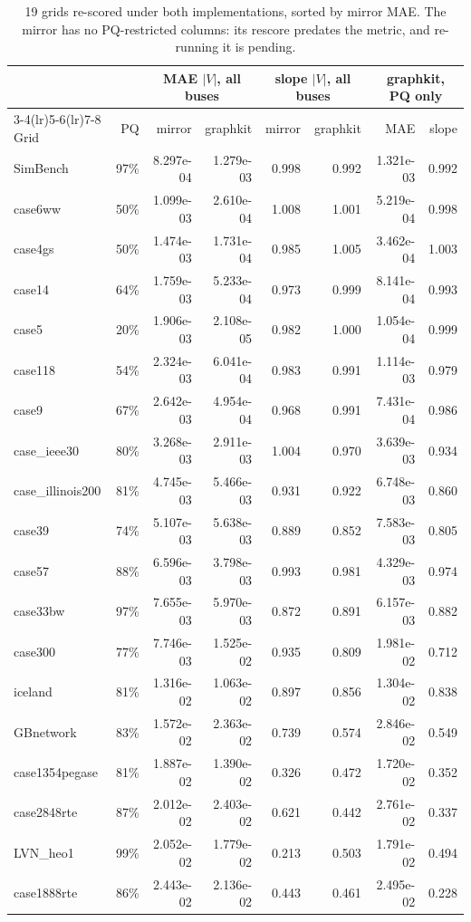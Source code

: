\documentclass[10pt]{article}
\begin{document}
\begin{table}[H]
\centering
\small
\begin{tabular}{lrrrrrrr}
\toprule
 & & \multicolumn{2}{c}{MAE $|V|$, all buses} & \multicolumn{2}{c}{slope $|V|$, all buses} & \multicolumn{2}{c}{graphkit, PQ only} \\
\cmidrule(lr){3-4}\cmidrule(lr){5-6}\cmidrule(lr){7-8}
Grid & PQ & mirror & graphkit & mirror & graphkit & MAE & slope \\
\midrule
SimBench & 97\% & 8.297e-04 & 1.279e-03 & 0.998 & 0.992 & 1.321e-03 & 0.992 \\
case6ww & 50\% & 1.099e-03 & 2.610e-04 & 1.008 & 1.001 & 5.219e-04 & 0.998 \\
case4gs & 50\% & 1.474e-03 & 1.731e-04 & 0.985 & 1.005 & 3.462e-04 & 1.003 \\
case14 & 64\% & 1.759e-03 & 5.233e-04 & 0.973 & 0.999 & 8.141e-04 & 0.993 \\
case5 & 20\% & 1.906e-03 & 2.108e-05 & 0.982 & 1.000 & 1.054e-04 & 0.999 \\
case118 & 54\% & 2.324e-03 & 6.041e-04 & 0.983 & 0.991 & 1.114e-03 & 0.979 \\
case9 & 67\% & 2.642e-03 & 4.954e-04 & 0.968 & 0.991 & 7.431e-04 & 0.986 \\
case\_ieee30 & 80\% & 3.268e-03 & 2.911e-03 & 1.004 & 0.970 & 3.639e-03 & 0.934 \\
case\_illinois200 & 81\% & 4.745e-03 & 5.466e-03 & 0.931 & 0.922 & 6.748e-03 & 0.860 \\
case39 & 74\% & 5.107e-03 & 5.638e-03 & 0.889 & 0.852 & 7.583e-03 & 0.805 \\
case57 & 88\% & 6.596e-03 & 3.798e-03 & 0.993 & 0.981 & 4.329e-03 & 0.974 \\
case33bw & 97\% & 7.655e-03 & 5.970e-03 & 0.872 & 0.891 & 6.157e-03 & 0.882 \\
case300 & 77\% & 7.746e-03 & 1.525e-02 & 0.935 & 0.809 & 1.981e-02 & 0.712 \\
iceland & 81\% & 1.316e-02 & 1.063e-02 & 0.897 & 0.856 & 1.304e-02 & 0.838 \\
GBnetwork & 83\% & 1.572e-02 & 2.363e-02 & 0.739 & 0.574 & 2.846e-02 & 0.549 \\
case1354pegase & 81\% & 1.887e-02 & 1.390e-02 & 0.326 & 0.472 & 1.720e-02 & 0.352 \\
case2848rte & 87\% & 2.012e-02 & 2.403e-02 & 0.621 & 0.442 & 2.761e-02 & 0.337 \\
LVN\_heo1 & 99\% & 2.052e-02 & 1.779e-02 & 0.213 & 0.503 & 1.791e-02 & 0.494 \\
case1888rte & 86\% & 2.443e-02 & 2.136e-02 & 0.443 & 0.461 & 2.495e-02 & 0.228 \\
\bottomrule
\end{tabular}
\caption{19 grids re-scored under both implementations, sorted by mirror MAE.
The mirror has no PQ-restricted columns: its rescore predates the metric, and
re-running it is pending.}
\end{table}
\end{document}
